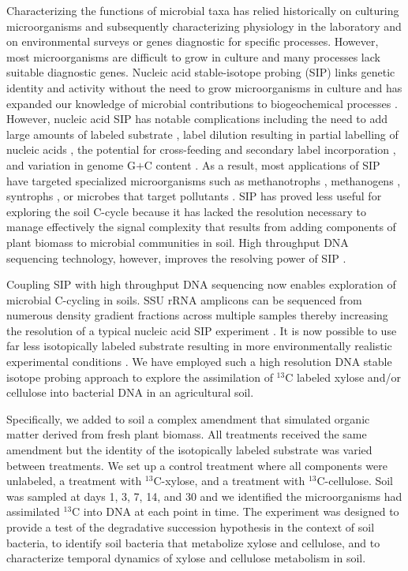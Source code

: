 Characterizing the functions of microbial taxa has relied historically on
culturing microorganisms and subsequently characterizing physiology in the
laboratory and on environmental surveys or genes diagnostic for specific
processes. However, most microorganisms are difficult to grow in
culture \citep{Janssen2006} and many processes lack suitable diagnostic genes.
Nucleic acid stable-isotope probing (SIP) links genetic identity and activity
without the need to grow microorganisms in culture and has expanded our
knowledge of microbial contributions to biogeochemical processes
\citep{Chen_Murrell_2010}. However, nucleic acid SIP has notable complications
including the need to add large amounts of labeled substrate
\citep{radajewski2000stable}, label dilution resulting in partial labelling of
nucleic acids \citep{radajewski2000stable,Manefield_2002,McDonald_2005}, the
potential for cross-feeding and secondary label incorporation
\citep{Morris_2002,Hutchens2004,14686943,DeRito2005,McDonald_2005,Ziegler_2005},
and variation in genome G$+$C content
\citep{Buckley_2007,9780408708036,Holben1995,Nusslein1999}. As a result, most
applications of SIP have targeted specialized microorganisms such as
methanotrophs \citep{radajewski2000stable}, methanogens \citep{lu2005},
syntrophs \citep{lueders2004}, or microbes that target pollutants
\citep{derito2005}. SIP has proved less useful for exploring the soil C-cycle
because it has lacked the resolution necessary to manage effectively the signal
complexity that results from adding components of plant biomass to microbial
communities in soil. High throughput DNA sequencing technology, however,
improves the resolving power of SIP \citep{Aoyagi2015}. 

Coupling SIP with high throughput DNA sequencing now enables exploration of
microbial C-cycling in soils. SSU rRNA amplicons can be sequenced
from numerous density gradient fractions across multiple samples thereby
increasing the resolution of a typical nucleic acid SIP experiment
\citep{Verastegui_2014}. It is now possible to use far less isotopically
labeled substrate resulting in more environmentally realistic experimental
conditions \citep{Aoyagi2015}. We have employed such a high resolution DNA
stable isotope probing approach to explore the assimilation of $^{13}$C labeled
xylose and/or cellulose into bacterial DNA in an agricultural soil. 

Specifically, we added to soil a complex amendment that simulated organic
matter derived from fresh plant biomass. All treatments received the same
amendment but the identity of the isotopically labeled substrate was varied
between treatments. We set up a control treatment where all components were
unlabeled, a treatment with $^{13}$C-xylose, and a treatment with
$^{13}$C-cellulose. Soil was sampled at days 1, 3, 7, 14, and 30 and we
identified the microorganisms had assimilated $^{13}$C into DNA at each point
in time. The experiment was designed to provide a test of the
degradative succession hypothesis in the context of soil bacteria, to identify
soil bacteria that metabolize xylose and cellulose, and to characterize
temporal dynamics of xylose and cellulose metabolism in soil. 
